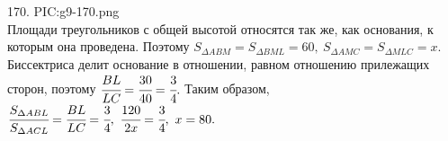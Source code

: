 170. {{PIC:g9-170.png}}\\
Площади треугольников с общей высотой относятся так же, как основания, к которым она проведена. Поэтому $S_{\Delta ABM}=S_{\Delta BML}=60,\ S_{\Delta AMC}=S_{\Delta MLC}=x.$ Биссектриса делит основание в отношении, равном отношению прилежащих сторон, поэтому $\cfrac{BL}{LC}=\cfrac{30}{40}=\cfrac{3}{4}.$ Таким образом,
$\cfrac{S_{\Delta ABL}}{S_{\Delta ACL}}=\cfrac{BL}{LC}=\cfrac{3}{4},\ \cfrac{120}{2x}=\cfrac{3}{4},\ x=80.$\newpage\noindent
